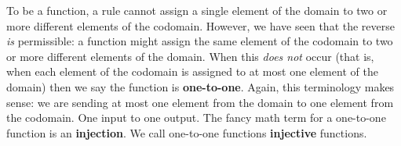 \documentclass[10pt,]{book}
\newcommand{\terminology}[1]{\textbf{#1}}
\theoremstyle{plain}
\theoremstyle{definition}
\theoremstyle{definition}
\theoremstyle{definition}
\numberwithin{equation}{section}
\begin{document}
      To be a function, a rule cannot assign a single element of the domain to two or more different elements of the codomain. However, we have seen that the reverse \emph{is} permissible: a function might assign the same element of the codomain to two or more different elements of the domain. When this \emph{does not} occur (that is, when each element of the codomain is assigned to at most one element of the domain) then we say the function is
      \terminology{one-to-one}. Again, this terminology makes sense: we are sending at most one element from the domain to one element from the codomain. One input to one output. The fancy math term for a one-to-one function is an
      \terminology{injection}. We call one-to-one functions
      \terminology{injective} functions.
\par
\end{document}
